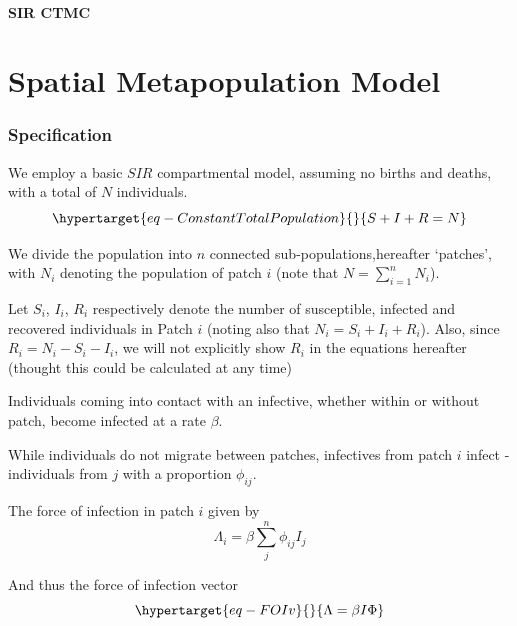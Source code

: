 \documentclass{monashthesis}
\begin{document}
\hypertarget{sir-ctmc}{%
\subsubsection{SIR CTMC}\label{sir-ctmc}}


\hypertarget{sec-MPMspec}{%
\chapter{Spatial Metapopulation Model}\label{sec-MPMspec}}

\hypertarget{specification}{%
\subsection{Specification}\label{specification}}

We employ a basic \(SIR\) compartmental model, assuming no births and
deaths, with a total of \(N\) individuals.
\begin{equation}\protect\hypertarget{eq-ConstantTotalPopulation}{}{ S + I  + R = N}\label{eq-ConstantTotalPopulation}\end{equation}

We divide the population into \(n\) connected sub-populations,hereafter
`patches', with \(N_i\) denoting the population of patch \(i\) (note
that \(N = \sum\limits_{i=1}^{n}N_i\)).

Let \(S_i\), \(I_i\), \(R_i\) respectively denote the number of
susceptible, infected and recovered individuals in Patch \(i\) (noting
also that \(N_i = S_i + I_i + R_i\)). Also, since
\(R_i = N_i - S_i - I_i\), we will not explicitly show \(R_i\) in the
equations hereafter (thought this could be calculated at any time)

Individuals coming into contact with an infective, whether within or
without patch, become infected at a rate \(\beta\).

While individuals do not migrate between patches, infectives from patch
\(i\) infect - individuals from \(j\) with a proportion \(\phi_{ij}\).

The force of infection in patch \(i\) given by \[
\Lambda_i = \beta \sum\limits_{j}^{n}\phi_{ij}I_j
\]

And thus the force of infection vector
\begin{equation}\protect\hypertarget{eq-FOIv}{}{\Lambda = \beta I \Phi}\label{eq-FOIv}\end{equation}
\end{document}
